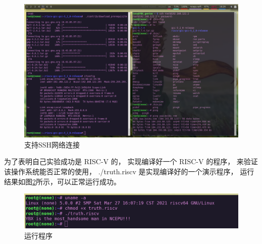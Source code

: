 \begin{figure}[htbp]
  \centering %
  \includegraphics[width=1.0 \textwidth]{figs/Process/ssh_transparent.png}
  \caption{支持SSH网络连接}
  \label{fig:ssh_transparent} %
\end{figure}

为了表明自己实验成功是 RISC-V 的， 实现编译好一个 RISC-V 的程序， 来验证该操作系统能否正常的使用， ./truth.riscv 是实现编译好的一个演示程序， 运行结果如图\ref{fig:run_truth}所示，可以正常运行成功。

\begin{figure}[htbp]
  \centering %
  \includegraphics[width=0.9 \textwidth]{figs/Process/run_truth.png}
  \caption{运行程序}
  \label{fig:run_truth} %
\end{figure}








